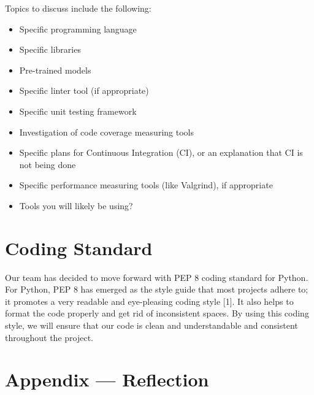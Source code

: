 \documentclass{article}
\begin{document}
Topics to discuss include the following:

\begin{itemize}
\item Specific programming language
\item Specific libraries
\item Pre-trained models
\item Specific linter tool (if appropriate)
\item Specific unit testing framework
\item Investigation of code coverage measuring tools
\item Specific plans for Continuous Integration (CI), or an explanation that CI
  is not being done
\item Specific performance measuring tools (like Valgrind), if
  appropriate
\item Tools you will likely be using?
\end{itemize}


\section{Coding Standard}


Our team has decided to move forward with PEP 8 coding standard for Python. For Python, PEP 8 has emerged as the style guide that most projects adhere to; it promotes a very readable and eye-pleasing coding style [1]. It also helps to format the code properly and get rid of inconsistent spaces. By using this coding style, we will ensure that our code is clean and understandable and consistent throughout the project.


\newpage{}

\section*{Appendix --- Reflection}



\end{document}
